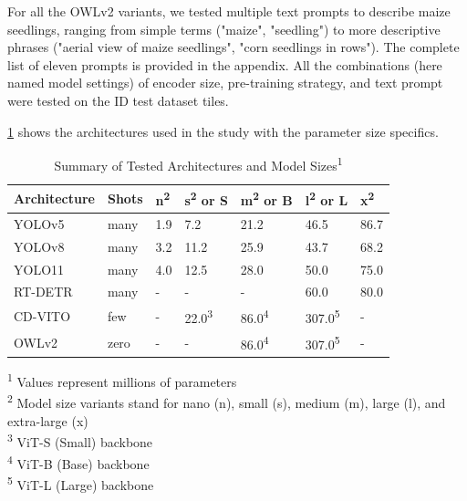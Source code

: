 \documentclass[journal,article,submit,pdftex,moreauthors]{Definitions/mdpi}
\begin{document}
For all the OWLv2 variants, we tested multiple text prompts to describe maize seedlings, ranging from simple terms ("maize", "seedling") to more descriptive phrases ("aerial view of maize seedlings", "corn seedlings in rows"). The complete list of eleven prompts is provided in the appendix. All the combinations (here named model settings) of encoder size, pre-training strategy, and text prompt were tested on the ID test dataset tiles.

\cref{tab:architectures} shows the architectures used in the study 
with the parameter size specifics.

\begin{table}[H]
  \caption{Summary of Tested Architectures and Model Sizes\textsuperscript{1}}
  \label{tab:architectures}
  \centering
  \begin{tabularx}{\textwidth}{lXXXXXX}
  \toprule
  \textbf{Architecture} &\textbf{Shots} & \textbf{n\textsuperscript{2}} & \textbf{s\textsuperscript{2} or S} & \textbf{m\textsuperscript{2} or B} & \textbf{l\textsuperscript{2} or L} & \textbf{x\textsuperscript{2}} \\
  \midrule
  YOLOv5 & many & 1.9 & 7.2 & 21.2 & 46.5 & 86.7 \\
  YOLOv8 & many & 3.2 & 11.2 & 25.9 & 43.7 & 68.2 \\
  YOLO11 & many & 4.0 & 12.5 & 28.0 & 50.0 & 75.0 \\
  RT-DETR & many & - & - & - & 60.0 & 80.0 \\
  CD-VITO & few & - & 22.0\textsuperscript{3} & 86.0\textsuperscript{4} & 307.0\textsuperscript{5} & - \\
  OWLv2 & zero & - & - & 86.0\textsuperscript{4} & 307.0\textsuperscript{5} & - \\
  \bottomrule
  \end{tabularx}
  \footnotesize{\textsuperscript{1} Values represent millions of parameters\\
  \textsuperscript{2} Model size variants stand for nano (n), small (s), medium (m), large (l), and extra-large (x)\\
  \textsuperscript{3} ViT-S (Small) backbone\\
  \textsuperscript{4} ViT-B (Base) backbone\\
  \textsuperscript{5} ViT-L (Large) backbone}
\end{table}
\end{document}
